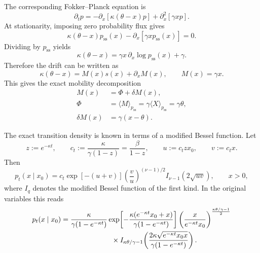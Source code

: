 \documentclass[11pt,twoside,fleqn]{article}
\begin{document}
The corresponding Fokker--Planck equation is
\begin{equation}
    \partial_t p
    =
    -\partial_x\!\left[\kappa(\theta-x)p\right]
    +
    \partial_x^2\!\left[\gamma x p\right].
    \label{eq:cir_fokker_planck_appendix}
\end{equation}
At stationarity, imposing zero probability flux gives
\begin{equation}
    \kappa(\theta-x)p_{\mathrm{ss}}(x)
    -
    \partial_x\!\left[\gamma x p_{\mathrm{ss}}(x)\right]
    =
    0.
    \label{eq:cir_zero_flux_appendix}
\end{equation}
Dividing by \(p_{\mathrm{ss}}\) yields
\begin{equation}
    \kappa(\theta-x)
    =
    \gamma x\,\partial_x\log p_{\mathrm{ss}}(x)
    +
    \gamma.
    \label{eq:cir_score_drift_identity_appendix}
\end{equation}
Therefore the drift can be written as
\begin{equation}
    \kappa(\theta-x)
    =
    M(x)s(x)+\partial_x M(x),
    \qquad
    M(x)=\gamma x.
    \label{eq:cir_score_mobility_appendix}
\end{equation}
This gives the exact mobility decomposition
\begin{align}
    M(x)
    &=
    \Phi+\delta M(x),
    \\
    \Phi
    &=
    \langle M\rangle_{p_{\mathrm{ss}}}
    =
    \gamma\langle X\rangle_{p_{\mathrm{ss}}}
    =
    \gamma\theta,
    \\
    \delta M(x)
    &=
    \gamma(x-\theta).
    \label{eq:cir_exact_mobility_decomposition_appendix}
\end{align}

The exact transition density is known in terms of a modified Bessel function. Let
\begin{equation}
    z:=e^{-\kappa t},
    \qquad
    c_t:=\frac{\kappa}{\gamma(1-z)}=\frac{\beta}{1-z},
    \qquad
    u:=c_t z x_0,
    \qquad
    v:=c_t x.
    \label{eq:cir_transition_variables_appendix}
\end{equation}
Then
\begin{equation}
    p_t(x\mid x_0)
    =
    c_t
    \exp[-(u+v)]
    \left(\frac{v}{u}\right)^{(\nu-1)/2}
    I_{\nu-1}\!\left(2\sqrt{uv}\right),
    \qquad x>0,
    \label{eq:cir_transition_density_appendix}
\end{equation}
where \(I_q\) denotes the modified Bessel function of the first kind. In the original variables this reads
\begin{equation}
\begin{aligned}
    p_t(x\mid x_0)
    &=
    \frac{\kappa}{\gamma(1-e^{-\kappa t})}
    \exp\!\left[
        -\frac{\kappa(e^{-\kappa t}x_0+x)}
        {\gamma(1-e^{-\kappa t})}
    \right]
    \left(
        \frac{x}{e^{-\kappa t}x_0}
    \right)^{\frac{\kappa\theta/\gamma-1}{2}}
    \\
    &\hspace{2.5cm}\times
    I_{\kappa\theta/\gamma-1}\!\left(
        \frac{2\kappa\sqrt{e^{-\kappa t}x_0x}}
        {\gamma(1-e^{-\kappa t})}
    \right).
\end{aligned}
\label{eq:cir_transition_density_original_appendix}
\end{equation}
\end{document}
